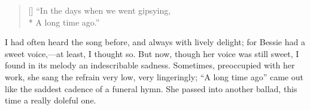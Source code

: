 \begin{verse}[\versewidth]
	\enquote{In the days when we went gipsying,\\*
		\hspace*{0.333em}\hspace*{0.333em} A long time ago.}
\end{verse}

I had often heard the song before, and always with lively delight; for
Bessie had a sweet voice,---at least, I thought so.  But now, though her
voice was still sweet, I found in its melody an indescribable sadness.
Sometimes, preoccupied with her work, she sang the refrain very low,
very lingeringly; \enquote{A long time ago} came out like the saddest
cadence of a funeral hymn.  She passed into another ballad, this time a
really doleful one.

